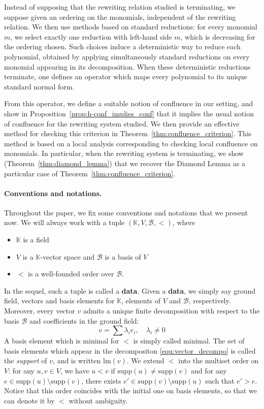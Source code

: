 \documentclass[10pt]{easychair}
\theoremstyle{definition}
\newcommand\data{{\color{red}\bf data}}
\newcommand\supp{\text{supp}}
\newcommand\lm{\text{lm}}
\newcommand\basis{\mathscr{B}}
\newcommand\K{\mathbb{K}}
\begin{document}
Instead of supposing that the rewriting relation studied is
terminating, we suppose given an ordering on the monomials,
independent of the rewriting relation.  We then use methods based on
standard reductions: for every monomial $m$, we select exactly one
reduction with left-hand side $m$, which is decreasing for the
ordering chosen. Such choices induce a deterministic way to reduce
each polynomial, obtained by applying simultaneously standard
reductions on every monomial appearing in its decomposition. When
these deterministic reductions terminate, one defines an operator
which maps every polynomial to its unique standard normal form.

From this operator, we define a suitable notion of confluence in
our setting, and show in Proposition~\ref{prop:h-conf_implies_conf}
that it implies the usual notion of confluence for the rewriting
system studied. We then provide an effective method for checking this
criterion in Theorem~\ref{thm:confluence_criterion}. This method is
based on a local analysis corresponding to checking local confluence
on monomials. In particular, when the rewriting system is terminating,
we show (Theorem~\ref{thm:diamond_lemma}) that we recover the Diamond
Lemma as a particular case of Theorem~\ref{thm:confluence_criterion}.

\paragraph{Conventions and notations.}

Throughout the paper, we fix some conventions and notations that we
present now. We will always work with a tuple  $(\K,V,\basis,<)$, where
\begin{itemize}
\item $\K$ is a field
\item $V$ is a $\K$-vector space and $\basis$ is a basis of $V$
\item $<$ is a well-founded order over $\basis$.
\end{itemize}
In the sequel, such a tuple is called a \data. Given a \data, we simply
say ground field, vectors and basis elements for $\K$, elements of $V$
and $\basis$, respectively. Moreover, every vector $v$ admits a unique
finite decomposition with respect to the basis $\basis$ and coefficients
in the ground field:
\begin{equation}\label{equ:vector_decompo}
  v=\sum\lambda_ie_i,\quad\lambda_i\neq 0
\end{equation}
A basis element which is minimal for $<$ is simply called minimal. The
set of basis elements which appear in the decompositon
\eqref{equ:vector_decompo} is called the {\it support} of $v$, and is
written $\lm(v)$. We extend $<$ into the multiset order on $V$: for any
$u,v \in V$, we have $u<v$ if $\supp(u)\neq\supp(v)$ and for any
$e\in\supp(u)\setminus\supp(v)$, there exists
$e'\in\supp(v)\setminus\supp(u)$ such that $e'>e$. Notice that this order
coincides with the initial one on basis elements, so that we can denote
it by $<$ without ambiguity.
\end{document}

